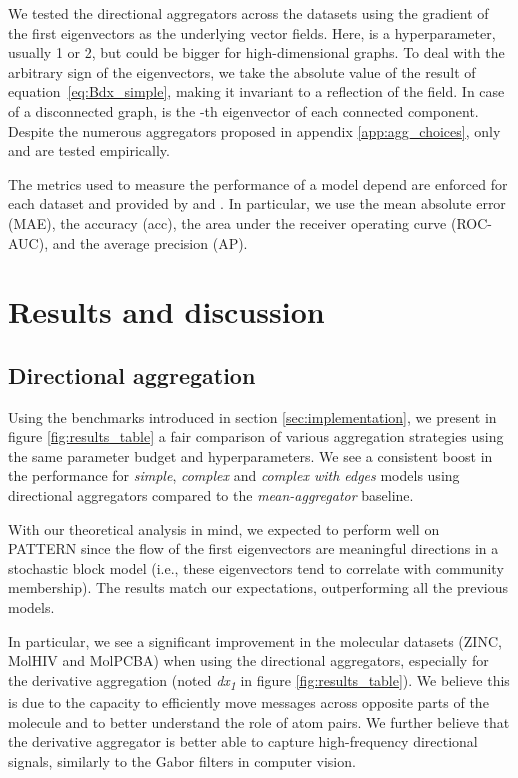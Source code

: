 \documentclass{article} \usepackage{arxiv,times}
\def\eqref#1{equation~\ref{#1}}
\begin{document}
We tested the directional aggregators across the datasets using the gradient of the first  eigenvectors  as the underlying vector fields. Here,  is a hyperparameter, usually 1 or 2, but could be bigger for high-dimensional graphs. To deal with the arbitrary sign of the eigenvectors, we take the absolute value of the result of \eqref{eq:Bdx_simple}, making it invariant to a reflection of the field. In case of a disconnected graph,  is the -th eigenvector of each connected component. Despite the numerous aggregators proposed in appendix \ref{app:agg_choices}, only  and  are tested empirically.

The metrics used to measure the performance of a model depend are enforced for each dataset and provided by \cite{dwivedi2020benchmarking} and \cite{hu2020open}. In particular, we use the mean absolute error (MAE), the accuracy (acc), the area under the receiver operating curve (ROC-AUC), and the average precision (AP).


\section{Results and discussion}


\subsection{Directional aggregation}

Using the benchmarks introduced in section \ref{sec:implementation}, we present in figure \ref{fig:results_table} a fair comparison of various aggregation strategies using the same parameter budget and hyperparameters. We see a consistent boost in the performance for \textit{simple}, \textit{complex} and \textit{complex with edges} models using directional aggregators compared to the \textit{mean-aggregator} baseline.


With our theoretical analysis in mind, we expected to perform well on PATTERN since the flow of the first eigenvectors are meaningful directions in a stochastic block model (i.e., these eigenvectors tend to correlate with community membership).
The results match our expectations, outperforming all the previous models.


In particular, we see a significant improvement in the molecular datasets (ZINC, MolHIV and MolPCBA) when using the directional aggregators, especially for the derivative aggregation  (noted \textit{dx\textsubscript{1}} in figure \ref{fig:results_table}). 
We believe this is due to the capacity to efficiently move  messages  across opposite parts of the molecule and to better understand the role of atom pairs. We further believe that the derivative aggregator is better able to capture high-frequency directional signals, similarly to the Gabor filters in computer vision.
\end{document}
